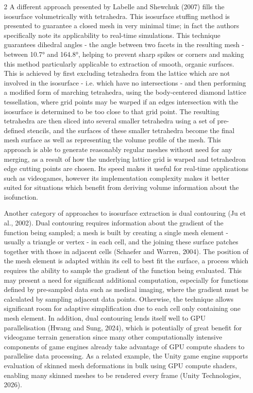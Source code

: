 \documentclass[]{article}
\begin{document}
\begin{multicols}{2}
A different approach presented by Labelle and Shewchuk (2007) fills the isosurface volumetrically with tetrahedra. This isosurface stuffing method is presented to guarantee a closed mesh in very minimal time; in fact the authors specifically note its applicability to real-time simulations. This technique guarantees dihedral angles - the angle between two facets in the resulting mesh - between 10.7° and 164.8°, helping to prevent sharp spikes or corners and making this method particularly applicable to extraction of smooth, organic surfaces. This is achieved by first excluding tetrahedra from the lattice which are not involved in the isosurface - i.e. which have no intersections - and then performing a modified form of marching tetrahedra, using the body-centered diamond lattice tessellation, where grid points may be warped if an edge\textquotesingle s intersection with the isosurface is determined to be too close to that grid point. The resulting tetrahedra are then sliced into several smaller tetrahedra using a set of pre-defined stencils, and the surfaces of these smaller tetrahedra become the final mesh surface as well as representing the volume profile of the mesh. This approach is able to generate reasonably regular meshes without need for any merging, as a result of how the underlying lattice grid is warped and tetrahedron edge cutting points are chosen. Its speed makes it useful for real-time applications such as videogames, however its implementation complexity makes it better suited for situations which benefit from deriving volume information about the isofunction.

Another category of approaches to isosurface extraction is dual contouring (Ju et al., 2002). Dual contouring requires information about the gradient of the function being sampled; a mesh is built by creating a single mesh element - usually a triangle or vertex - in each cell, and the joining these surface patches together with those in adjacent cells (Schaefer and Warren, 2004). The position of the mesh element is adapted within its cell to best fit the surface, a process which requires the ability to sample the gradient of the function being evaluated. This may present a need for significant additional computation, especially for functions defined by pre-sampled data such as medical imaging, where the gradient must be calculated by sampling adjacent data points. Otherwise, the technique allows significant room for adaptive simplification due to each cell only containing one mesh element. In addition, dual contouring lends itself well to GPU parallelisation (Hwang and Sung, 2024), which is potentially of great benefit for videogame terrain generation since many other computationally intensive components of game engines already take advantage of GPU compute shaders to parallelise data processing. As a related example, the Unity game engine supports evaluation of skinned mesh deformations in bulk using GPU compute shaders, enabling many skinned meshes to be rendered every frame (Unity Technologies, 2026).


\end{multicols}
\end{document}

